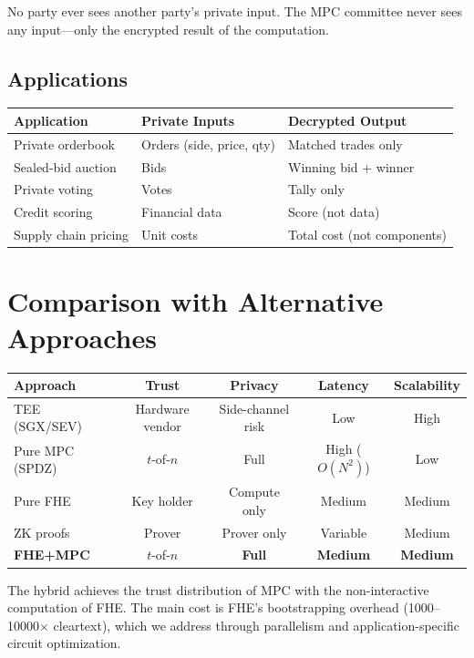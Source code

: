 \documentclass[11pt,a4paper]{article}
\begin{document}
No party ever sees another party's private input. The MPC committee never sees any input---only the encrypted result of the computation.

\subsection{Applications}

\begin{center}
\begin{tabular}{lll}
\toprule
\textbf{Application} & \textbf{Private Inputs} & \textbf{Decrypted Output} \\
\midrule
Private orderbook & Orders (side, price, qty) & Matched trades only \\
Sealed-bid auction & Bids & Winning bid + winner \\
Private voting & Votes & Tally only \\
Credit scoring & Financial data & Score (not data) \\
Supply chain pricing & Unit costs & Total cost (not components) \\
\bottomrule
\end{tabular}
\end{center}

\section{Comparison with Alternative Approaches}

\begin{center}
\begin{tabular}{lcccc}
\toprule
\textbf{Approach} & \textbf{Trust} & \textbf{Privacy} & \textbf{Latency} & \textbf{Scalability} \\
\midrule
TEE (SGX/SEV) & Hardware vendor & Side-channel risk & Low & High \\
Pure MPC (SPDZ) & $t$-of-$n$ & Full & High ($O(N^2)$) & Low \\
Pure FHE & Key holder & Compute only & Medium & Medium \\
ZK proofs & Prover & Prover only & Variable & Medium \\
\textbf{FHE+MPC} & $t$-of-$n$ & \textbf{Full} & \textbf{Medium} & \textbf{Medium} \\
\bottomrule
\end{tabular}
\end{center}

The hybrid achieves the trust distribution of MPC with the non-interactive computation of FHE. The main cost is FHE's bootstrapping overhead (1000--10000$\times$ cleartext), which we address through parallelism and application-specific circuit optimization.
\end{document}
